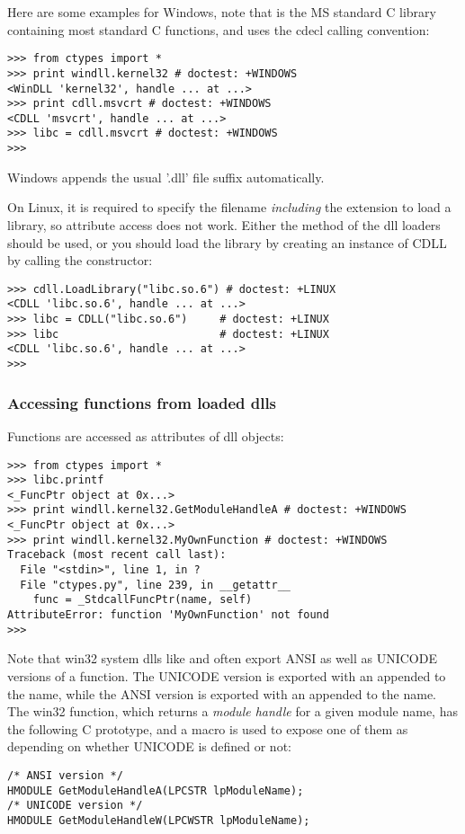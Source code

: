 Here are some examples for Windows, note that  is the MS
standard C library containing most standard C functions, and uses the
cdecl calling convention:
\begin{verbatim}
>>> from ctypes import *
>>> print windll.kernel32 # doctest: +WINDOWS
<WinDLL 'kernel32', handle ... at ...>
>>> print cdll.msvcrt # doctest: +WINDOWS
<CDLL 'msvcrt', handle ... at ...>
>>> libc = cdll.msvcrt # doctest: +WINDOWS
>>>
\end{verbatim}

Windows appends the usual '.dll' file suffix automatically.

On Linux, it is required to specify the filename \emph{including} the
extension to load a library, so attribute access does not work.
Either the  method of the dll loaders should be used,
or you should load the library by creating an instance of CDLL by
calling the constructor:
\begin{verbatim}
>>> cdll.LoadLibrary("libc.so.6") # doctest: +LINUX
<CDLL 'libc.so.6', handle ... at ...>
>>> libc = CDLL("libc.so.6")     # doctest: +LINUX
>>> libc                         # doctest: +LINUX
<CDLL 'libc.so.6', handle ... at ...>
>>>
\end{verbatim}


\subsubsection{Accessing functions from loaded dlls\label{ctypes-accessing-functions-from-loaded-dlls}}

Functions are accessed as attributes of dll objects:
\begin{verbatim}
>>> from ctypes import *
>>> libc.printf
<_FuncPtr object at 0x...>
>>> print windll.kernel32.GetModuleHandleA # doctest: +WINDOWS
<_FuncPtr object at 0x...>
>>> print windll.kernel32.MyOwnFunction # doctest: +WINDOWS
Traceback (most recent call last):
  File "<stdin>", line 1, in ?
  File "ctypes.py", line 239, in __getattr__
    func = _StdcallFuncPtr(name, self)
AttributeError: function 'MyOwnFunction' not found
>>>
\end{verbatim}

Note that win32 system dlls like  and  often
export ANSI as well as UNICODE versions of a function. The UNICODE
version is exported with an  appended to the name, while the ANSI
version is exported with an  appended to the name. The win32
 function, which returns a \emph{module handle} for a
given module name, has the following C prototype, and a macro is used
to expose one of them as  depending on whether
UNICODE is defined or not:
\begin{verbatim}
/* ANSI version */
HMODULE GetModuleHandleA(LPCSTR lpModuleName);
/* UNICODE version */
HMODULE GetModuleHandleW(LPCWSTR lpModuleName);
\end{verbatim}

